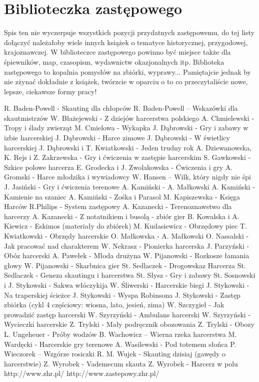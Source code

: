 \chapter{Biblioteczka zastępowego}
Spis ten nie wyczerpuje wszystkich pozycji przydatnych zastępowemu, do tej listy dołączyć należałoby wiele innych książek o tematyce historycznej, przygodowej, krajoznawczej. W biblioteczce zastępowego powinno być miejsce także dla śpiewników, map, czasopism, wydawnictw okazjonalnych itp. Biblioteka zastępowego to kopalnia pomysłów na zbiórki, wyprawy... Pamiętajcie jednak by nie zżynać dokładnie z książek, twórzcie w oparciu o to co przeczytaliście nowe, lepsze, ciekawsze formy pracy!

R. Baden-Powell - Skauting dla chłopców
R. Baden-Powell – Wskazówki dla skautmistrzów
W. Błażejewski - Z dziejów harcerstwa polskiego
A. Chmielewski - Tropy i ślady zwierząt
M. Cmielowa - Wykapka
J. Dąbrowski - Gry i zabawy w izbie harcerskiej
J. Dąbrowski - Harce zimowe
J. Dąbrowski - W świetlicy harcerskiej
J. Dąbrowski i T. Kwiatkowski - Jeden trudny rok
A. Dziewanowska, K. Rejs i Z. Zakrzewska - Gry i ćwiczenia w zastępie harcerskim
S. Gawkowski - Szkice polowe harcerza
E. Grodecka i J. Zwolakowska - Ćwiczenia i gry
A. Gromski - Harce młodzika i wywiadowcy
W. Hansen – Wilk, który nigdy nie śpi
J. Jasiński - Gry i ćwiczenia terenowe
A. Kamiński - A. Małkowski
A. Kamiński - Kamienie na szaniec
A. Kamiński - Zośka i Parasol
M. Kapiszewska - Księga Harców R.Philips - System zastępowy
A. Kazanecki - Terenoznawstwo dla harcerzy
A. Kazanecki - Z notatnikiem i busolą - zbiór gier
B. Kowalska i A. Kiewicz - Eskimos (materiały do zbiórek)
M. Kudasiewicz - Obrzędowy piec
T. Kwiatkowski - Obrzędy harcerskie
O. Małkowska - A. Małkowski
O. Nassalski - Jak pracować nad charakterem
W. Nekrasz - Pionierka harcerska
J. Parzyński - Obóz harcerski
A. Pawełek - Młoda drużyna
W. Pijanowski - Rozkosze łamania głowy
W. Pijanowski - Skarbnica gier
St. Sedlaczek - Drogowskaz Harcerza
St. Sedlaczek - Geneza skautingu i harcerstwa
St. Słysz - Gry i zabawy
St. Sosnowski i J. Stykowski - Sakwa włóczykija
W. Śliwerski - Harcerskie biegi
J. Stykowski - Na traperskiej ścieżce
J. Stykowski - Wyspa Robinsona
J. Stykowski - Zastęp zbiórka (cykl 4 częściowy: wiosna, lato, jesień, zima)
W. Szczygieł - Jak prowadzić zastęp harcerski
W. Szyrzyński - Ambulans harcerski
W. Szyrzyński - Wycieczki harcerskie
Z. Trylski - Mały podręcznik obozowania
Z. Trylski - Obozy 
L. Ungeheuer - Próby wodzów
B. Wachowicz – Wierna rzeka harcerstwa
M. Wardęcki - Harcerskie gry terenowe
A. Wasilewski - Pod totemem słońca
P. Wieczorek – Wzgórze rosiczki
R. M. Wujek - Skauting dzisiaj (gawędy o harcerstwie)
Z. Wyrobek - Vademecum skauta
Z. Wyrobek - Harcerz w polu
http://www.zhr.pl/
http://www.zastepowy.zhr.pl/